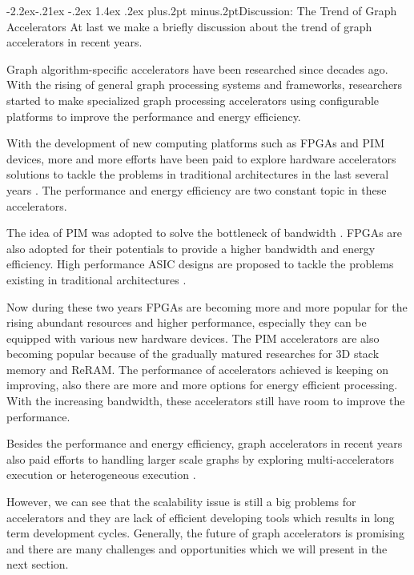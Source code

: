 \documentclass[twoside]{article}
\makeatletter
\def\subsubsection{\@startsection{subsubsection}{3}{\z@}%
 {-2.2ex\@plus -.21ex \@minus -.2ex}%
 {1.4ex \@plus.2ex}
{\normalfont\normalsize\protect\baselineskip=12pt plus.2pt minus.2pt\sl}}
\makeatother
\begin{document}
\begin{multicols}{2}
\subsubsection{Discussion: The Trend of Graph Accelerators}
At last we make a briefly discussion about the trend of graph accelerators in recent years. 

Graph algorithm-specific accelerators have been researched since decades ago. With the rising of general graph processing systems and frameworks, researchers started to make specialized graph processing accelerators using configurable platforms \cite{delorimier2006graphstep, betkaoui2011graphlet} to improve the performance and energy efficiency. 

With the development of new computing platforms such as FPGAs and PIM devices, more and more efforts have been paid to explore hardware accelerators solutions to tackle the problems in traditional architectures in the last several years \cite{attia2014cygraph,nurvitadhi2014graphgen,ahn2015tesseract,ham2016graphicionado}. The performance and energy efficiency are two constant topic in these accelerators.

The idea of PIM was adopted to solve the bottleneck of bandwidth \cite{ahn2015tesseract}.  FPGAs are also adopted for their potentials to provide a higher bandwidth and energy efficiency. High performance ASIC designs are proposed to tackle the problems existing in traditional architectures \cite{ham2016graphicionado,ozdal2016energy}. 

Now during these two years FPGAs are becoming more and more popular for the rising abundant resources and higher performance, especially they can be equipped with various new hardware devices. The PIM accelerators are also becoming popular because of the gradually matured researches for 3D stack memory and ReRAM. The performance of accelerators achieved is keeping on improving, also there are more and more options for energy efficient processing. With the increasing bandwidth, these accelerators still have room to improve the performance. 

Besides the performance and energy efficiency, graph accelerators in recent years also paid efforts to handling larger scale graphs by exploring multi-accelerators \cite{Dai2017foregraph} execution or heterogeneous execution \cite{zhou2017cpufpga}. 

However, we can see that the scalability issue is still a big problems for accelerators and they are lack of efficient developing tools which results in long term development cycles. Generally, the future of graph accelerators is promising and there are many challenges and opportunities which we will present in the next section.




\end{multicols}
\end{document}
